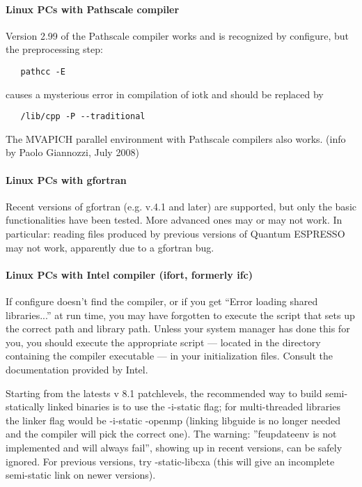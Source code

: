 \documentclass[12pt,a4paper]{article}
\begin{document}
\paragraph{Linux PCs with Pathscale compiler}

Version 2.99 of the Pathscale compiler works and is recognized by
configure, but the preprocessing step:
\begin{verbatim}
   pathcc -E
\end{verbatim}
causes a mysterious error in compilation of iotk and should be replaced by
\begin{verbatim}
   /lib/cpp -P --traditional
\end{verbatim}
The MVAPICH parallel environment with Pathscale compilers also works.
(info by Paolo Giannozzi, July 2008)

\paragraph{Linux PCs with gfortran}

Recent versions of gfortran (e.g. v.4.1 and later) are supported, but
only the basic functionalities have been tested. More advanced ones
may or may not work. In particular: reading files produced by previous
versions of Quantum ESPRESSO may not work, apparently due to a gfortran bug.

\paragraph{Linux PCs with Intel compiler (ifort, formerly ifc)}

If configure doesn't find the compiler, or if you get “Error loading shared
libraries...” at run time, you may have forgotten to execute the script that
sets up the correct path and library path. Unless your system manager has
done this for you, you should execute the appropriate script — located in
the directory containing the compiler executable — in your
initialization files. Consult the documentation provided by Intel. 
    
Starting from the latests v 8.1 patchlevels, the recommended way to build
semi-statically linked binaries is to use the -i-static ﬂag; for multi-threaded
libraries the linker ﬂag would be -i-static -openmp (linking libguide is
no longer needed and the compiler will pick the correct one). The warning:
''feupdateenv is not implemented and will always fail'', showing up in recent 
versions, can be safely ignored. For previous versions, try -static-libcxa 
(this will give an incomplete semi-static link on newer versions).
\end{document}
